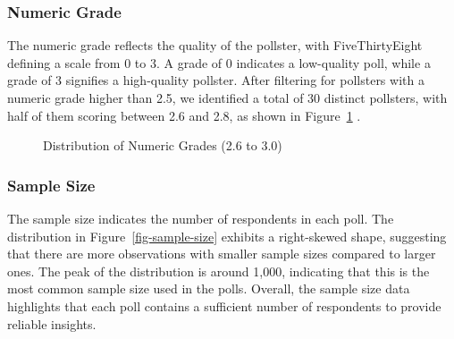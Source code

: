 \documentclass[
  letterpaper,
  DIV=11,
  numbers=noendperiod]{scrartcl}
\begin{document}
\subsubsection{Numeric Grade}\label{numeric-grade}

The numeric grade reflects the quality of the pollster, with
FiveThirtyEight defining a scale from 0 to 3. A grade of 0 indicates a
low-quality poll, while a grade of 3 signifies a high-quality pollster.
After filtering for pollsters with a numeric grade higher than 2.5, we
identified a total of 30 distinct pollsters, with half of them scoring
between 2.6 and 2.8, as shown in Figure~\ref{fig-numeric-grade} .

\begin{figure}


\caption{\label{fig-numeric-grade}Distribution of Numeric Grades (2.6 to
3.0)}

\end{figure}%

\subsubsection{Sample Size}\label{sample-size}

The sample size indicates the number of respondents in each poll. The
distribution in Figure~\ref{fig-sample-size} exhibits a right-skewed
shape, suggesting that there are more observations with smaller sample
sizes compared to larger ones. The peak of the distribution is around
1,000, indicating that this is the most common sample size used in the
polls. Overall, the sample size data highlights that each poll contains
a sufficient number of respondents to provide reliable insights.
\end{document}
